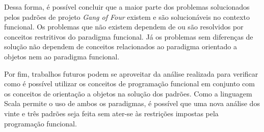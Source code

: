 Dessa forma, é possível concluir que a maior 
parte dos problemas solucionados pelos 
padrões de projeto \textit{Gang of Four} 
existem e são solucionáveis no contexto 
funcional. Os problemas que não existem 
dependem de ou são resolvidos por conceitos 
restritivos do paradigma funcional. Já 
os problemas sem diferenças de solução não 
dependem de conceitos relacionados ao 
paradigma orientado a objetos nem ao 
paradigma funcional.


Por fim, trabalhos futuros podem se aproveitar 
da análise realizada para verificar como 
é possível utilizar os conceitos de 
programação funcional em conjunto com os 
conceitos de orientação a objetos na 
solução dos padrões. Como a linguagem Scala 
permite o uso de ambos os paradigmas, 
é possível que uma nova 
análise dos vinte e três padrões seja feita 
sem ater-se às restrições impostas pela 
programação funcional. 